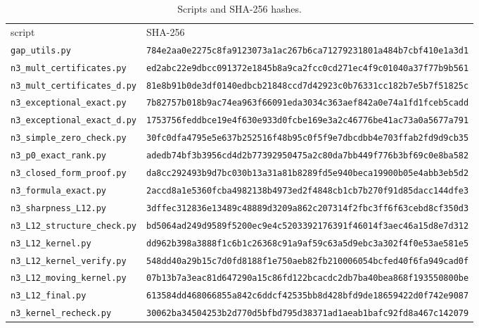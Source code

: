 \documentclass[aps,prx,reprint,superscriptaddress,nobibnotes,longbibliography]{revtex4-2}
\begin{document}
\begin{table}[t]
\caption{Scripts and SHA-256 hashes.}
\label{tab:S8}
\begin{ruledtabular}
\begin{tabular}{ll}
script & SHA-256\\
\colrule
\texttt{gap\_utils.py} & \texttt{\scriptsize 784e2aa0e2275c8fa9123073a1ac267b6ca71279231801a484b7cbf410e1a3d1}\\
\texttt{n3\_mult\_certificates.py} & \texttt{\scriptsize ed2abc22e9dbcc091372e1845b8a9ca2fcc0cd271ec4f9c01040a37f77b9b561}\\
\texttt{n3\_mult\_certificates\_d.py} & \texttt{\scriptsize 81e8b91b0de3df0140edbcb21848ccd7d42923c0b76331cc182b7e5b7f51825c}\\
\texttt{n3\_exceptional\_exact.py} & \texttt{\scriptsize 7b82757b018b9ac74ea963f66091eda3034c363aef842a0e74a1fd1fceb5cadd}\\
\texttt{n3\_exceptional\_exact\_d.py} & \texttt{\scriptsize 1753756feddbce19e4f630e933d0fcbe169e3a2c46776be41ac73a0a5677a791}\\
\texttt{n3\_simple\_zero\_check.py} & \texttt{\scriptsize 30fc0dfa4795e5e637b252516f48b95c0f5f9e7dbcdbb4e703ffab2fd9d9cb35}\\
\texttt{n3\_p0\_exact\_rank.py} & \texttt{\scriptsize adedb74bf3b3956cd4d2b77392950475a2c80da7bb449f776b3bf69c0e8ba582}\\
\texttt{n3\_closed\_form\_proof.py} & \texttt{\scriptsize da8cc292493b9d7bc030b13a31a81b8289fd5e940beca19900b05e4abb3eb5d2}\\
\texttt{n3\_formula\_exact.py} & \texttt{\scriptsize 2accd8a1e5360fcba4982138b4973ed2f4848cb1cb7b270f91d85dacc144dfe3}\\
\texttt{n3\_sharpness\_L12.py} & \texttt{\scriptsize 3dffec312836e13489c48889d3209a862c207314f2fbc3ff6f63cebd8cf350d3}\\
\texttt{n3\_L12\_structure\_check.py} & \texttt{\scriptsize bd5064ad249d9589f5200ec9e4c5203392176391f46014f3aec46a15d8e7d312}\\
\texttt{n3\_L12\_kernel.py} & \texttt{\scriptsize dd962b398a3888f1c6b1c26368c91a9af59c63a5d9ebc3a302f4f0e53ae581e5}\\
\texttt{n3\_L12\_kernel\_verify.py} & \texttt{\scriptsize 548dd40a29b15c7d0fd8188f1e750aeb82fb210006054bcfed40f6fa949cad0f}\\
\texttt{n3\_L12\_moving\_kernel.py} & \texttt{\scriptsize 07b13b7a3eac81d647290a15c86fd122bcacdc2db7ba40bea868f193550800be}\\
\texttt{n3\_L12\_final.py} & \texttt{\scriptsize 613584dd468066855a842c6ddcf42535bb8d428bfd9de18659422d0f742e9087}\\
\texttt{n3\_kernel\_recheck.py} & \texttt{\scriptsize 30062ba34504253b2d770d5bfbd795d38371ad1aeab1bafc92fd8a467c142079}\\
\end{tabular}
\end{ruledtabular}
\end{table}
\end{document}
